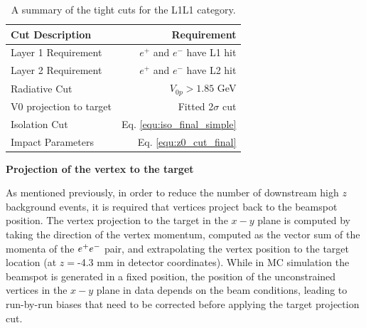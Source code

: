 \begin{table}[!hb] 
    \centering
    \begin{tabular}{lr}
        \toprule
        \textbf{Cut Description} & \textbf{Requirement} \\
        \midrule
        Layer 1 Requirement & $e^+$ and $e^-$ have L1 hit \\
        Layer 2 Requirement & $e^+$ and $e^-$ have L2 hit \\
        Radiative Cut & $V_{0p} > 1.85$ GeV \\
        V0 projection to target & Fitted 2$\sigma$ cut \\
        Isolation Cut & Eq. \ref{equ:iso_final_simple} \\ %
        Impact Parameters & Eq. \ref{equ:z0_cut_final} \\
        \bottomrule
    \end{tabular}
    \caption{A summary of the tight cuts for the L1L1 category.}
    \label{tab:L1L1cuts}
\end{table}

\clearpage

\textbf{Projection of the vertex to the target}


As mentioned previously, in order to reduce the number of downstream high $z$ background events, it is required that vertices project back to the beamspot position. The vertex projection to the target in the $x-y$ plane is computed by taking the direction of the vertex momentum, computed as the vector sum of the momenta of the $e^{+}e^{-}$ pair, and extrapolating the vertex position to the target location (at $z=$-4.3 mm in detector coordinates). While in MC simulation the beamspot is generated in a fixed position, the position of the unconstrained vertices in the $x-y$ plane in data depends on the beam conditions, leading to run-by-run biases that need to be corrected before applying the target projection cut. 

